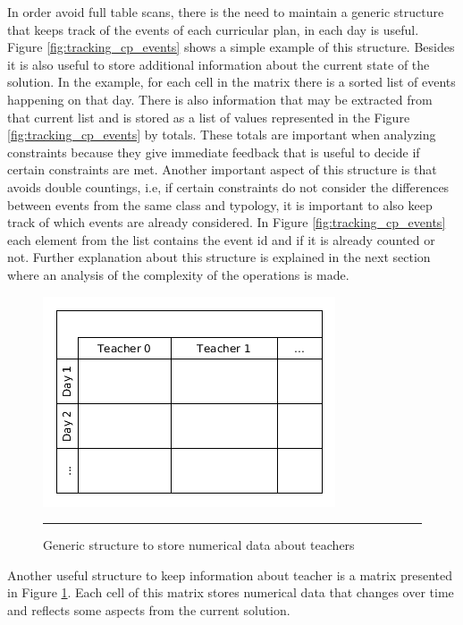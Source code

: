 In order avoid full table scans, there is the need to maintain a generic structure that keeps track of the events of each curricular plan, in each day is useful. Figure \ref{fig:tracking_cp_events} shows a simple example of this structure. Besides it is also useful to store additional information about the current state of the solution. In the example, for each cell in the matrix there is a sorted list of events happening on that day. There is also information that may be extracted from that current list and is stored as a list of values represented in the Figure \ref{fig:tracking_cp_events} by totals. These totals are important when analyzing constraints because they give immediate feedback that is useful to decide if certain constraints are met. Another important aspect of this structure is that avoids double countings, i.e, if certain constraints do not consider the differences between events from the same class and typology, it is important to also keep track of which events are already considered. In Figure \ref{fig:tracking_cp_events} each element from the list contains the event id and if it is already counted or not. Further explanation about this structure is explained in the next section where an analysis of the complexity of the operations is made. 

\begin{figure}[t]
	\centering
	\includegraphics[scale=0.5]{./Figures/DataStructures/yED/generic_info_tracking.png}
	\rule{35em}{0.5pt}
	\caption[Generic structure to store numerical data about teachers]{Generic structure to store numerical data about teachers} 
	\label{fig:teacher_stats_track}
\end{figure}

Another useful structure to keep information about teacher is a matrix presented in Figure \ref{fig:teacher_stats_track}. Each cell of this matrix stores numerical data that changes over time and reflects some aspects from the current solution.

